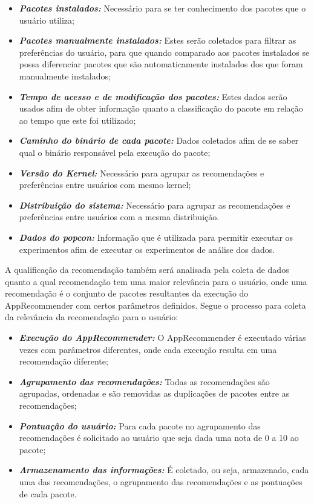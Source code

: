 \begin{itemize}
    \item \textit{\textbf{Pacotes instalados:}} Necessário para se ter conhecimento dos pacotes que o usuário utiliza;
    \item \textit{\textbf{Pacotes manualmente instalados:}} Estes serão coletados para filtrar as preferências do usuário, para que quando comparado aos pacotes instalados se possa diferenciar pacotes que são automaticamente instalados dos que foram manualmente instalados;
    \item \textit{\textbf{Tempo de acesso e de modificação dos pacotes:}} Estes dados serão usados afim de obter informação quanto a classificação do pacote em relação ao tempo que este foi utilizado;
    \item \textit{\textbf{Caminho do binário de cada pacote:}} Dados coletados afim de se saber qual o binário responsável pela execução do pacote;
    \item \textit{\textbf{Versão do Kernel:}} Necessário para agrupar as recomendações e preferências entre usuários com mesmo kernel;
    \item \textit{\textbf{Distribuição do sistema:}} Necessário para agrupar as recomendações e preferências entre usuários com a mesma distribuição.
    \item \textit{\textbf{Dados do popcon:}} Informação que é utilizada para permitir executar os experimentos afim de executar os experimentos de análise dos dados.
\end{itemize}

A qualificação da recomendação também será analisada pela coleta de dados
quanto a qual recomendação tem uma maior relevância para o usuário, onde
uma recomendação é o conjunto de pacotes resultantes da execução do
AppRecommender com certos parâmetros definidos. Segue o processo para
coleta da relevância da recomendação para o usuário:

\begin{itemize}
    \item \textit{\textbf{Execução do AppRecommender:}} O AppRecommender é executado várias vezes com parâmetros diferentes, onde cada execução resulta em uma recomendação diferente;
    \item \textit{\textbf{Agrupamento das recomendações:}} Todas as recomendações são agrupadas, ordenadas e são removidas as duplicações de pacotes entre as recomendações;
    \item \textit{\textbf{Pontuação do usuário:}} Para cada pacote no agrupamento das recomendações é solicitado ao usuário que seja dada uma nota de 0 a 10 ao pacote;
    \item \textit{\textbf{Armazenamento das informações:}} É coletado, ou seja, armazenado, cada uma das recomendações, o agrupamento das recomendações e as pontuações de cada pacote.
\end{itemize}


